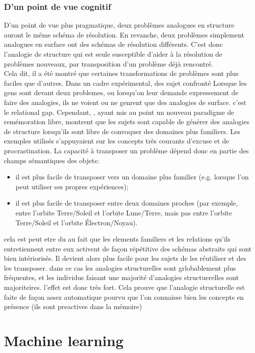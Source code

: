 \documentclass[french]{article}
\begin{document}
		\subsubsection{D'un point de vue cognitif}
		D'un point de vue plus pragmatique, deux problèmes analogues en structure auront le même schéma de résolution. En revanche, deux problèmes simplement analogues en surface ont des schémas de résolution différents. C'est donc l'analogie de structure qui est seule susceptible d'aider à la résolution de problèmes nouveaux, par transposition d'un problème déjà rencontré.\\
		Cela dit, il a été montré que certaines transformations de problèmes sont plus faciles que d'autres. Dans un cadre expérimental, des sujet confronté  Lorsque les gens sont devant deux problemes, ou lorsqu'on leur demande expressement de faire des analogies, ils ne voient ou ne genrent que des analogies de surface. c'est le relational gap. Cependant, \cite{raynal2018}, ayant mis au point un nouveau paradigme de remémoration libre, montrent que les sujets sont capable de générer des analogies de structure lorsqu'ils sont libre de convoquer des domaines plus familiers. Les exemples utilisés s'appuyaient sur les concepts très courants d'excuse et de procrastination. La capacité à transposer un problème dépend donc en partie des champs sémantiques des objets:
		\begin{itemize}
			\item il est plus facile de transposer vers un domaine plus familier (e.g. lorsque l'on peut utiliser ses propres expériences);
			\item il est plus facile de transposer entre deux domaines proches (par exemple, entre l'orbite Terre/Soleil et l'orbite Lune/Terre, mais pas entre l'orbite Terre/Soleil et l'orbite Électron/Noyau).
		\end{itemize}		
		cela est peut etre du au fait que les elements familiers et les relations qu'ils entretiennent entre eux activent de façon répétitive des schémas abstraits qui sont bien intériorisés. Il devient alors plus facile pour les sujets de les réutiliser et des les transposer. dans ce cas les analogies structurelles sont grlobablement plus fréquentes, et les individus faisant une majorité d'analogies structuerelles sont majoriteires. l'effet est donc très fort. Cela prouve que l'analogie structurelle est faite de façon assez automatique pourvu que l'on connaisse bien les concepts en présence (ils sont preactives dans la mémoire)
	\section{Machine learning}
\end{document}
